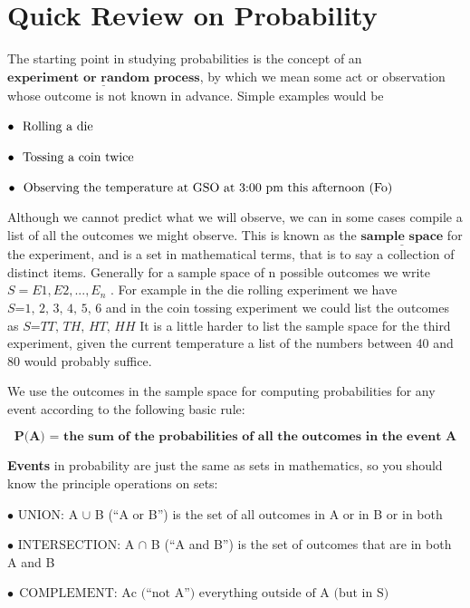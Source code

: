 \documentclass[
]{book}
\begin{document}
\section{Quick Review on Probability}\label{quick-review-on-probability}

The starting point in studying probabilities is the concept of an \(\underline{\textbf{experiment or random process}}\), by which we mean some act or observation whose outcome is not known in advance. Simple examples would be

\(\bullet\ \  \text{Rolling a die} \\ \\\)

\(\bullet \ \ \text{Tossing a coin twice} \\ \\\)

\(\bullet \ \ \text{Observing the temperature at GSO at 3:00 pm this afternoon (Fo)} \\\)

Although we cannot predict what we will observe, we can in some cases compile a list of all the outcomes we might observe. This is known as the \(\underline{\textbf{sample space}}\) for the experiment, and is a set in mathematical terms, that is to say a collection of distinct items. Generally for a sample space of n possible outcomes we write \(S = {E1, E2, ... , E_n}\) . For example in the die rolling experiment we have \(\textit{S={1, 2, 3, 4, 5, 6}}\) and in the coin tossing experiment we could list the outcomes as \(\textit{S={TT, TH, HT, HH}}\) It is a little harder to list the sample space for the third experiment, given the current temperature a list of the numbers between 40 and 80 would probably suffice.

We use the outcomes in the sample space for computing probabilities for any event according to the following basic rule:

\[
\textbf{P(A) = the sum of the probabilities of all the outcomes in the event A}
\]

\textbf{Events} in probability are just the same as sets in mathematics, so you should know the principle operations on sets:

\(\bullet\) UNION: A \(\cup\) B (``A or B'') is the set of all outcomes in A or in B or in both

\(\bullet\) INTERSECTION: A \(\cap\) B (``A and B'') is the set of outcomes that are in both A and B

\(\bullet\ \ \text{COMPLEMENT: Ac (“not A”) everything outside of A (but in S)}\)
\end{document}
